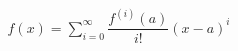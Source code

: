 \documentclass[preview]{standalone}
\begin{document}
\begin{align*}
f(x) = \sum_{i=0}^{\infty}\dfrac{f^{(i)}(a)}{i!}(x-a)^i
\end{align*}
\end{document}
